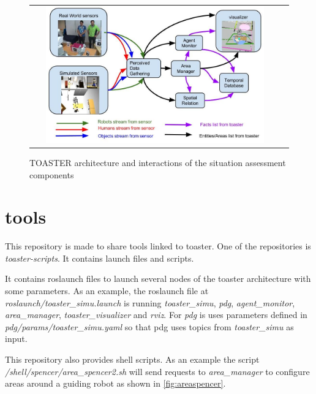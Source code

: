 \documentclass[a4paper]{article}
\begin{document}
 \begin{figure}[ht!]
 \centering
 \begin{tabular}{cc}
  \includegraphics[width=0.9\textwidth]{img/toasterArch.jpg}
 \end{tabular}
 \caption{TOASTER architecture and interactions of the situation assessment components}
 \label{fig:architecture}
 \end{figure}


\section{tools}
This repository is made to share tools linked to toaster.
One of the repositories is \textit{toaster-scripts}. It contains launch files and scripts.

It contains roslaunch files to launch several nodes of the toaster architecture with some parameters.
As an example, the roslaunch file at  \textit{roslaunch/toaster\_simu.launch} is running \textit{toaster\_simu}, \textit{pdg}, \textit{agent\_monitor}, \textit{area\_manager}, \textit{toaster\_visualizer} and \textit{rviz}. For \textit{pdg} is uses parameters defined in \textit{pdg/params/toaster\_simu.yaml} so that pdg uses topics from \textit{toaster\_simu} as input.

This repository also provides shell scripts. As an example the script \textit{/shell/spencer/area\_spencer2.sh} will send requests to \textit{area\_manager} to configure areas around a guiding robot as shown in \ref{fig:areaspencer}.
\end{document}
